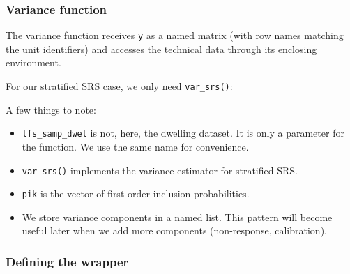 \documentclass[
]{article}
\newenvironment{Shaded}{\begin{snugshade}}{\end{snugshade}}
\newcommand{\AttributeTok}[1]{\textcolor[rgb]{0.13,0.29,0.53}{#1}}
\newcommand{\ControlFlowTok}[1]{\textcolor[rgb]{0.13,0.29,0.53}{\textbf{#1}}}
\newcommand{\DecValTok}[1]{\textcolor[rgb]{0.00,0.00,0.81}{#1}}
\newcommand{\FunctionTok}[1]{\textcolor[rgb]{0.13,0.29,0.53}{\textbf{#1}}}
\newcommand{\NormalTok}[1]{#1}
\newcommand{\OtherTok}[1]{\textcolor[rgb]{0.56,0.35,0.01}{#1}}
\newcommand{\SpecialCharTok}[1]{\textcolor[rgb]{0.81,0.36,0.00}{\textbf{#1}}}
\newcommand{\StringTok}[1]{\textcolor[rgb]{0.31,0.60,0.02}{#1}}
\providecommand{\tightlist}{%
  \setlength{\itemsep}{0pt}\setlength{\parskip}{0pt}}
\begin{document}
\subsubsection{Variance function}\label{variance-function}

The variance function receives \texttt{y} as a named matrix (with row
names matching the unit identifiers) and accesses the technical data
through its enclosing environment.

For our stratified SRS case, we only need \texttt{var\_srs()}:

\begin{Shaded}
\end{Shaded}

A few things to note:

\begin{itemize}
\tightlist
\item
  \texttt{lfs\_samp\_dwel} is not, here, the dwelling dataset. It is
  only a parameter for the function. We use the same name for
  convenience.
\item
  \texttt{var\_srs()} implements the variance estimator for stratified
  SRS.
\item
  \texttt{pik} is the vector of first-order inclusion probabilities.
\item
  We store variance components in a named list. This pattern will become
  useful later when we add more components (non-response, calibration).
\end{itemize}

\subsubsection{Defining the wrapper}\label{defining-the-wrapper}
\end{document}
